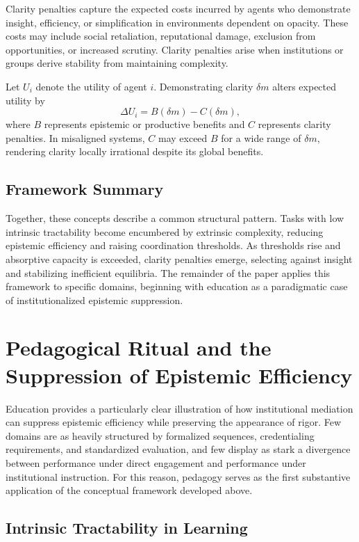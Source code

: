 \documentclass[11pt]{article}
\begin{document}
Clarity penalties capture the expected costs incurred by agents who demonstrate insight, efficiency, or simplification in environments dependent on opacity. These costs may include social retaliation, reputational damage, exclusion from opportunities, or increased scrutiny. Clarity penalties arise when institutions or groups derive stability from maintaining complexity.

Let \(U_i\) denote the utility of agent \(i\). Demonstrating clarity \(\delta m\) alters expected utility by
\[
\Delta U_i = B(\delta m) - C(\delta m),
\]
where \(B\) represents epistemic or productive benefits and \(C\) represents clarity penalties. In misaligned systems, \(C\) may exceed \(B\) for a wide range of \(\delta m\), rendering clarity locally irrational despite its global benefits.

\subsection{Framework Summary}

Together, these concepts describe a common structural pattern. Tasks with low intrinsic tractability become encumbered by extrinsic complexity, reducing epistemic efficiency and raising coordination thresholds. As thresholds rise and absorptive capacity is exceeded, clarity penalties emerge, selecting against insight and stabilizing inefficient equilibria. The remainder of the paper applies this framework to specific domains, beginning with education as a paradigmatic case of institutionalized epistemic suppression.

\section{Pedagogical Ritual and the Suppression of Epistemic Efficiency}

Education provides a particularly clear illustration of how institutional mediation can suppress epistemic efficiency while preserving the appearance of rigor. Few domains are as heavily structured by formalized sequences, credentialing requirements, and standardized evaluation, and few display as stark a divergence between performance under direct engagement and performance under institutional instruction. For this reason, pedagogy serves as the first substantive application of the conceptual framework developed above.

\subsection{Intrinsic Tractability in Learning}
\end{document}
